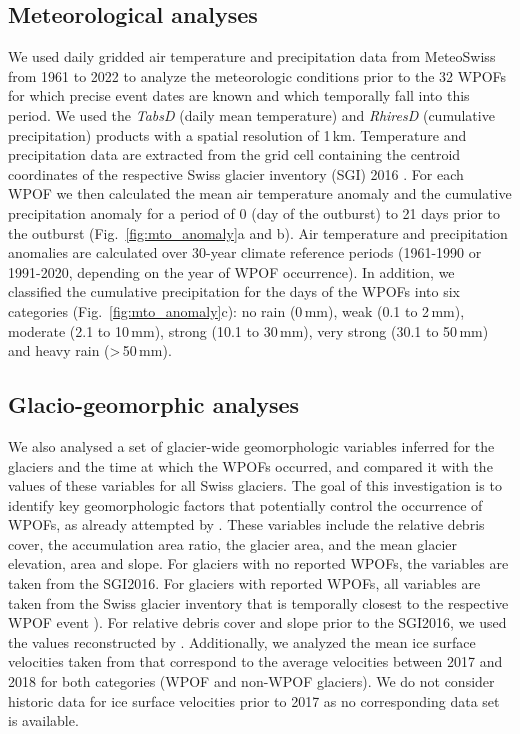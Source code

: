 \subsection{ Meteorological analyses}
\label{method_meteo}

We used daily gridded air temperature and precipitation data from MeteoSwiss from 1961 to 2022 \citep{MeteoSwiss2022} to analyze the meteorologic conditions prior to the 32 WPOFs for which precise event dates are known and which temporally fall into this period. We used the \textit{TabsD} (daily mean temperature) and \textit{RhiresD} (cumulative precipitation) products with a spatial resolution of 1\,km. Temperature and precipitation data are extracted from the grid cell containing the centroid coordinates of the respective Swiss glacier inventory (SGI) 2016 \citep{Linsbauer&al2021}. For each WPOF we then calculated the mean air temperature anomaly and the cumulative precipitation anomaly for a period of 0 (day of the outburst) to 21 days prior to the outburst (Fig.~\ref{fig:mto_anomaly}a and b). Air temperature and precipitation anomalies are calculated over 30-year climate reference periods (1961-1990 or 1991-2020, depending on the year of WPOF occurrence). In addition, we classified the cumulative precipitation for the days of the WPOFs into six categories (Fig.~\ref{fig:mto_anomaly}c): no rain (0\,mm), weak (0.1 to 2\,mm), moderate (2.1 to 10\,mm), strong (10.1 to 30\,mm), very strong (30.1 to 50\,mm) and heavy rain (>\,50\,mm).


\subsection{ Glacio-geomorphic analyses}
\label{method_geo}

We also analysed a set of glacier-wide geomorphologic variables inferred for the glaciers and the time at which the WPOFs occurred, and compared it with the values of these variables for all Swiss glaciers. The goal of this investigation is to identify key geomorphologic factors that potentially control the occurrence of WPOFs, as already attempted by \cite{Haeberli1983}. These variables include the relative debris cover, the accumulation area ratio, the glacier area, and the mean glacier elevation, area and slope. For glaciers with no reported WPOFs, the variables are taken from the SGI2016. For glaciers with reported WPOFs, all variables are taken from the Swiss glacier inventory that is temporally closest to the respective WPOF event \citep[SGI1850, SGI1973 and SGI2016;][]{Muller&al1976,Maisch&al2000,Linsbauer&al2021}). For relative debris cover and slope prior to the SGI2016, we used the values reconstructed by \cite{Altrock2022}. Additionally, we analyzed the mean ice surface velocities taken from \cite{Millan&al2022} that correspond to the average velocities between 2017 and 2018 for both categories (WPOF and non-WPOF glaciers). We do not consider historic data for ice surface velocities prior to 2017 as no corresponding data set is available.



